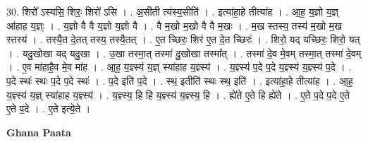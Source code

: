 \documentclass[17pt]{extarticle}
\begin{document}
30. शिरो᳚ ऽस्यसि॒ शिरः॒ शिरो॑ ऽसि । . अ॒सीती त्य॑स्य॒सीति॑ । . इत्या॑हा॒हे तीत्या॑ह । . आ॒ह॒ य॒ज्ञो य॒ज्ञ् आ॑हाह य॒ज्ञ्ः । . य॒ज्ञो वै वै य॒ज्ञो य॒ज्ञो वै । . वै म॒खो म॒खो वै वै म॒खः । . म॒ख स्तस्य॒ तस्य॑ म॒खो म॒ख स्तस्य॑ । . तस्यै॒त दे॒तत् तस्य॒ तस्यै॒तत् । . ए॒त च्छिरः॒ शिर॑ ए॒त दे॒त च्छिरः॑ । . शिरो॒ यद् यच्छिरः॒ शिरो॒ यत् । . यदु॒खोखा यद् यदु॒खा । . उ॒खा तस्मा॒त् तस्मा॑ दु॒खोखा तस्मा᳚त् । . तस्मा॑ दे॒व मे॒वम् तस्मा॒त् तस्मा॑ दे॒वम् । . ए॒व मा॑हाहै॒व मे॒व मा॑ह । . आ॒ह॒ य॒ज्ञ्स्य॑ य॒ज्ञ् स्या॑हाह य॒ज्ञ्स्य॑ । . य॒ज्ञ्स्य॑ प॒दे प॒दे य॒ज्ञ्स्य॑ य॒ज्ञ्स्य॑ प॒दे । . प॒दे स्थः॑ स्थः प॒दे प॒दे स्थः॑ । . प॒दे इति॑ प॒दे । . स्थ॒ इतीति॑ स्थः स्थ॒ इति॑ । . इत्या॑हा॒हे तीत्या॑ह । . आ॒ह॒ य॒ज्ञ्स्य॑ य॒ज्ञ् स्या॑हाह य॒ज्ञ्स्य॑ । . य॒ज्ञ्स्य॒ हि हि य॒ज्ञ्स्य॑ य॒ज्ञ्स्य॒ हि । . ह्ये॑ते ए॒ते हि ह्ये॑ते । . ए॒ते प॒दे प॒दे ए॒ते ए॒ते प॒दे । . ए॒ते इत्ये॒ते । \newline

\textbf{Ghana Paata } \newline
\end{document}
